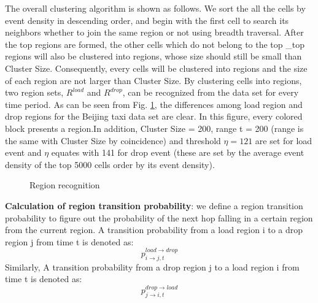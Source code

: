 The overall clustering algorithm is shown as follows. We sort the all the cells by event density in descending order, 
and begin with the first cell to search its neighbors whether to join the same region or not using breadth traversal. 
After the top regions are formed, the other cells which do not belong to the top \_top regions will also be clustered into regions, 
whose size should still be small than Cluster Size. Consequently, every cells will be clustered into regions and the size of each region are not larger than Cluster Size.
By clustering cells into regions, two region sets, \textbf{$R^{load}$} and \textbf{$R^{drop}$}, can be recognized from the data set for every time period. As can be seen from Fig. \ref{figure_region_recognizition}, the differences among load region and drop regions for the Beijing taxi data set are clear.
In this figure, every colored block presents a region.In addition, Cluster Size = 200, range t = 200 (range is the same with Cluster Size by coincidence) and threshold $\eta = 121$ are set for load event and $\eta$ equates with 141 for drop event (these are set by the average event density of the top 5000 cells order by its event density).

\begin{figure}[!t]
\centering
{}
\centering
\caption{Region recognition}\label{figure_region_recognizition}
\end{figure}

\textbf{Calculation of region transition probability}:
we define a region transition probability to figure out the probability of the next hop falling in a certain region from the current region.  A transition probability from a load region i to a drop region j from time t is denoted as:
\begin{equation}
p^{load\rightarrow drop}_{i\rightarrow j,t}
\end{equation}
Similarly, A transition probability from a drop region j to a load region i from time t is denoted as:
\begin{equation}
p^{drop\rightarrow load}_{j\rightarrow i,t}
\end{equation}


